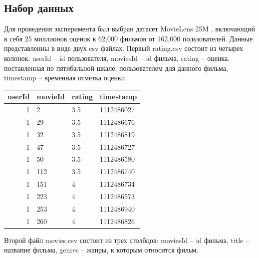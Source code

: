 \subsection{Набор данных}
Для проведения эксперимента был выбран датасет MovieLens 25M \cite{voc3}, включающий в себя 25 миллионов оценок к 62,000 фильмов от 162,000 пользователей.
Данные представленны в виде двух csv файлах. Первый rating.csv состоит из
четырех колонок: userId -- id пользователя, moviesId -- id фильма, 
rating -- оценка, поставленная по пятибальной шкале, пользователем для данного фильма,
timestamp -- временная отметка оценки.
   \begin{center}
   \begin{tabular}{ | r  | l | l | l |}
      \hline
      userId & movieId & rating & timestamp  \\ \hline
      1 & 2 & 3.5 & 1112486027 \\
      1 & 29 & 3.5 & 1112486676 \\
      1 & 32 & 3.5 & 1112486819\\
      1 & 47 & 3.5 & 1112486727 \\
      1 & 50 & 3.5 & 1112486580 \\
      1 & 112 & 3.5 & 1112486740 \\
      1 & 151 & 4 & 1112486734 \\
      1 & 223 & 4 & 1112486573 \\
      1 & 253 & 4 & 1112486940 \\
      1 & 260 & 4 & 1112486826 \\
      \hline
      \end{tabular}
   \end{center}
Второй файл movies.csv состоит из трех столбцов: moviesId -- id фильма, 
title -- название фильма, genres -- жанры, к которым относится фильм.
   \begin{center}
      \end{center}

